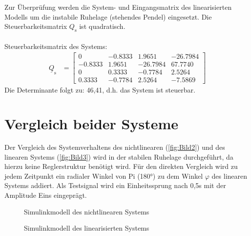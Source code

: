 \documentclass[
	pagesize,
	fontsize=12pt,
	paper=a4,
	oneside,
   reqno
]{scrartcl}
\begin{document}
Zur Überprüfung werden die System- und Eingangsmatrix des linearisierten Modells um die instabile Ruhelage (stehendes Pendel) eingesetzt. Die Steuerbarkeitsmatrix $Q_{\mathrm{s}}$ ist quadratisch.\\
\\Steuerbarkeitsmatrix des Systems:
\begin{align}\label{eq:Gleichung35}
    \underline{Q}_{\mathrm{s}} &=
    \begin{bmatrix}
        0 & -0.8333 & 1.9651 & -26.7984 \\
        -0.8333 & 1.9651 & -26.7984 & 67.7740 \\
        0 & 0.3333 & -0.7784 & 2.5264 \\
        0.3333 & -0.7784 & 2.5264 & -7.5869
    \end{bmatrix}
\end{align}
Die Determinante folgt zu: 46,41, d.h. das System ist steuerbar.

\clearpage

\section{Vergleich beider Systeme} \label{sec:systemvergleich}
Der Vergleich des Systemverhaltens des nichtlinearen (\autoref{fig:Bild2}) und des linearen Systems (\autoref{fig:Bild3}) wird in der stabilen Ruhelage durchgeführt, da hierzu keine Reglerstruktur benötigt wird. Für den direkten Vergleich wird zu jedem Zeitpunkt ein radialer Winkel von Pi (180°) zu dem Winkel $\varphi$ des linearen Systems addiert. Als Testsignal wird ein Einheitssprung nach 0,5s mit der Amplitude Eins eingeprägt.
\begin{figure}[H]
   \centering
   \caption[Simulinkmodell des nichtlinearen Systems]{Simulinkmodell des nichtlinearen Systems}
   \label{fig:Bild2}
\end{figure}

\begin{figure}[H]
   \centering
   \caption[Simulinkmodell des linearisierten Systems]{Simulinkmodell des linearisierten Systems}
   \label{fig:Bild3}
\end{figure}
\end{document}
